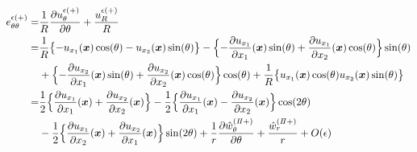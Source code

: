 \begin{align}
	e_{\theta\theta}^{\epsilon(+)}
		=&\frac{1}{R}\frac{\partial u_{\theta}^{\epsilon(+)}}{\partial \theta}
			+\frac{u_{R}^{\epsilon(+)}}{R}
		\nonumber
		\\
		=&\frac{1}{R}\bigl\{-u_{x_{1}}(\bm{x})\cos(\theta)-u_{x_{2}}(\bm{x})\sin(\theta)\bigr\}
		-\Bigl\{ -\frac{\partial u_{x_{1}}}{\partial x_{1}}(\bm{x})\sin(\theta)
			+\frac{\partial u_{x_{1}}}{\partial x_{2}}(\bm{x})\cos(\theta)\Bigr\}\sin(\theta)
		\nonumber
		\\
		&+\Bigl\{ -\frac{\partial u_{x_{2}}}{\partial x_{1}}(\bm{x})\sin(\theta)
			+\frac{\partial u_{x_{2}}}{\partial x_{2}}(\bm{x})\cos(\theta)\Bigr\}\cos(\theta)
		+\frac{1}{R}\bigl\{u_{x_{1}}(\bm{x})\cos(\theta)u_{x_{2}}(\bm{x})\sin(\theta)\bigr\}
		\nonumber
		\\
		=&\frac{1}{2}\Bigl\{ \frac{\partial u_{x_{1}}}{\partial x_{1}}(\bm{x})
			+\frac{\partial u_{x_{2}}}{\partial x_{2}}(\bm{x})\Bigr\}
		-\frac{1}{2}\Bigl\{ \frac{\partial u_{x_{1}}}{\partial x_{1}}(\bm{x})
			-\frac{\partial u_{x_{2}}}{\partial x_{2}}(\bm{x})\Bigr\}\cos(2\theta)
		\nonumber
		\\
		&-\frac{1}{2}\Bigl\{ \frac{\partial u_{x_{1}}}{\partial x_{2}}(\bm{x})
			+\frac{\partial u_{x_{2}}}{\partial x_{1}}(\bm{x})\Bigr\}\sin(2\theta)
		+\frac{1}{r}\frac{\partial \hat{w}_{\theta}^{(I\hspace{-.15em}I+)}}{\partial \theta}
			+\frac{\hat{w}_{r}^{(I\hspace{-.15em}I+)}}{r}+O(\epsilon)
	\label{eq:eThThOutEps}
\end{align}

